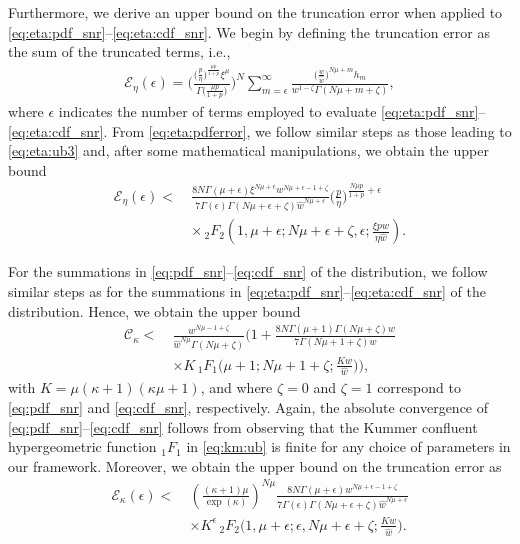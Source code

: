 \documentclass[journal,twocolumn]{IEEEtran}
\begin{document}
Furthermore, we derive an upper bound on the truncation error when applied to \eqref{eq:eta:pdf_snr}--\eqref{eq:eta:cdf_snr}. We begin by defining the truncation error as the sum of the truncated terms, i.e.,
\begin{align} \label{eq:eta:pdferror}
        \mathcal{E}_{\eta}(\epsilon) = \Bigg(\frac{\big(\frac{p}{\eta }\big)^{\frac{\mu  p}{1+p}} \xi^{\mu }}{\Gamma \big(\frac{\mu  p}{1+p}\big)}\Bigg)^N \sum _{m=\epsilon}^{\infty } \frac{\big(\frac{w}{\hat{w}}\big)^{N \mu+m} h_m}{w ^{1-\zeta } \Gamma (N \mu + m +\zeta )},
\end{align}
where $\epsilon$ indicates the number of terms employed to evaluate \eqref{eq:eta:pdf_snr}--\eqref{eq:eta:cdf_snr}. From \eqref{eq:eta:pdferror}, we follow similar steps as those leading to \eqref{eq:eta:ub3} and, after some mathematical manipulations, we obtain the upper bound
\begin{align}
   \mathcal{E}_{\eta}(\epsilon) < \ &   \frac{8 N \Gamma (\mu +\epsilon)\xi^{N\mu+\epsilon} w^{N \mu+\epsilon-1+\zeta} }{7 \Gamma (\epsilon) \Gamma (N \mu +\epsilon + \zeta)\hat{w} ^{N \mu+\epsilon}} \bigg(\frac{p}{\eta }\bigg)^{\frac{N \mu p}{1+p}+\epsilon}  \nonumber \\
    & \times \, _2F_2\left(1,\mu +\epsilon;N \mu+\epsilon+\zeta,\epsilon;\frac{\xi p w}{  \eta \hat{w}}\right). \label{eq:eta:truncerror}
\end{align}


For the summations in \eqref{eq:pdf_snr}--\eqref{eq:cdf_snr} of the \km{} distribution, we follow similar steps as for the summations in \eqref{eq:eta:pdf_snr}--\eqref{eq:eta:cdf_snr} of the \Ehm{} distribution. Hence, we obtain the upper bound 
\begin{align}
    \mathcal{C}_{\kappa} < \ & \frac{w^{N \mu-1+\zeta}}{\hat{w} ^{N \mu} \Gamma (N \mu +\zeta )} \bigg( 1 +\frac{8 N  \Gamma (\mu +1) \Gamma (N \mu +\zeta) w}{7 \Gamma (N \mu +1 + \zeta) \hat{w}} \nonumber \\
    & \times K \, _1F_1\bigg(\mu +1;N \mu+1+\zeta;\frac{K w}{ \hat{w}}\bigg)\bigg), \label{eq:km:ub}
\end{align}
with $K = \mu (\kappa+1) (\kappa\mu+1)$, and where $\zeta = 0$ and $\zeta = 1$ correspond to  \eqref{eq:pdf_snr} and \eqref{eq:cdf_snr}, respectively. Again, the absolute convergence of \eqref{eq:pdf_snr}--\eqref{eq:cdf_snr} follows from observing that the Kummer confluent hypergeometric function $_1F_1$ in \eqref{eq:km:ub} is finite for any choice of parameters in our framework. Moreover, we obtain the upper bound on the truncation error as
\begin{align}
    \mathcal{E}_{\kappa}(\epsilon) < \ & \left(\frac{(\kappa +1) \mu}{\exp(\kappa)} \right)^{N \mu} \frac{8 N \Gamma (\mu +\epsilon) w^{N \mu+\epsilon-1+\zeta}}{7 \Gamma (\epsilon) \Gamma (N \mu +\epsilon+\zeta) \hat{w} ^{N \mu+\epsilon}} \nonumber \\
    & \times K^{\epsilon} \, _2F_2\bigg(1,\mu +\epsilon;\epsilon,N \mu+\epsilon+\zeta;\frac{K w}{ \hat{w}}\bigg). \label{eq:kappa:truncerror}
\end{align}
\end{document}

